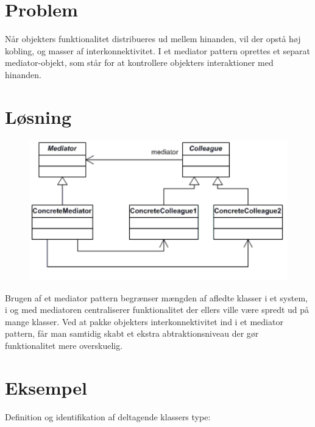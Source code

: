 \section{Problem}
Når objekters funktionalitet distribueres ud mellem hinanden, vil der opstå høj kobling, og masser af interkonnektivitet.  I et mediator pattern oprettes et separat mediator-objekt, som står for at kontrollere objekters interaktioner med hinanden. 

\section{Løsning}

\begin{figure}[h]
	\centering
	\includegraphics{figs/concrete}
	\caption{}
	\label{fig:concrete}
\end{figure}

Brugen af et mediator pattern begrænser mængden af afledte klasser i et system, i og med mediatoren centraliserer funktionalitet der ellers ville være spredt ud på mange klasser. Ved at pakke objekters interkonnektivitet ind i et mediator pattern, får man samtidig skabt et ekstra abtraktionsniveau der gør funktionalitet mere overskuelig.

\section{Eksempel}
Definition og identifikation af deltagende klassers type:

